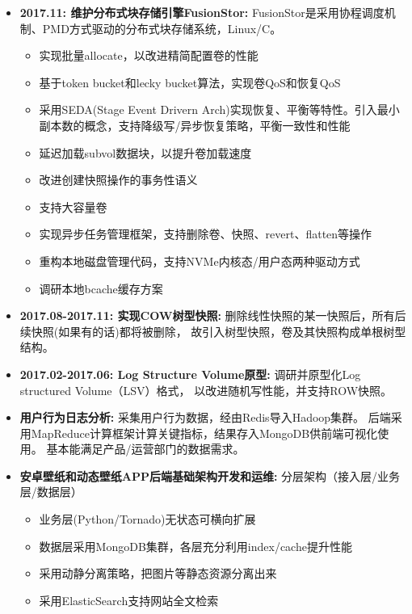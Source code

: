   \begin{itemize}[leftmargin=*]
      \item \textbf{2017.11: 维护分布式块存储引擎FusionStor:} FusionStor是采用协程调度机制、PMD方式驱动的分布式块存储系统，Linux/C。
          {\small
          \begin{itemize}
              \item 实现批量allocate，以改进精简配置卷的性能
              \item 基于token bucket和lecky bucket算法，实现卷QoS和恢复QoS
              \item 采用SEDA(Stage Event Drivern Arch)实现恢复、平衡等特性。引入最小副本数的概念，支持降级写/异步恢复策略，平衡一致性和性能
              \item 延迟加载subvol数据块，以提升卷加载速度
              \item 改进创建快照操作的事务性语义
              \item 支持大容量卷
              \item 实现异步任务管理框架，支持删除卷、快照、revert、flatten等操作
              \item 重构本地磁盘管理代码，支持NVMe内核态/用户态两种驱动方式
              \item 调研本地bcache缓存方案
          \end{itemize}
          }

      \item \textbf{2017.08-2017.11: 实现COW树型快照:} 删除线性快照的某一快照后，所有后续快照(如果有的话)都将被删除，
          故引入树型快照，卷及其快照构成单根树型结构。

      \item \textbf{2017.02-2017.06: Log Structure Volume原型:} 调研并原型化Log structured Volume（LSV）格式，
          以改进随机写性能，并支持ROW快照。

      \item \textbf{用户行为日志分析:} 采集用户行为数据，经由Redis导入Hadoop集群。
          后端采用MapReduce计算框架计算关键指标，结果存入MongoDB供前端可视化使用。
          基本能满足产品/运营部门的数据需求。

      \item \textbf{安卓壁纸和动态壁纸APP后端基础架构开发和运维:} 分层架构（接入层/业务层/数据层）
          {\small
          \begin{itemize}
              \item 业务层(Python/Tornado)无状态可横向扩展
              \item 数据层采用MongoDB集群，各层充分利用index/cache提升性能
              \item 采用动静分离策略，把图片等静态资源分离出来
              \item 采用ElasticSearch支持网站全文检索
          \end{itemize}
          }


\end{itemize}
